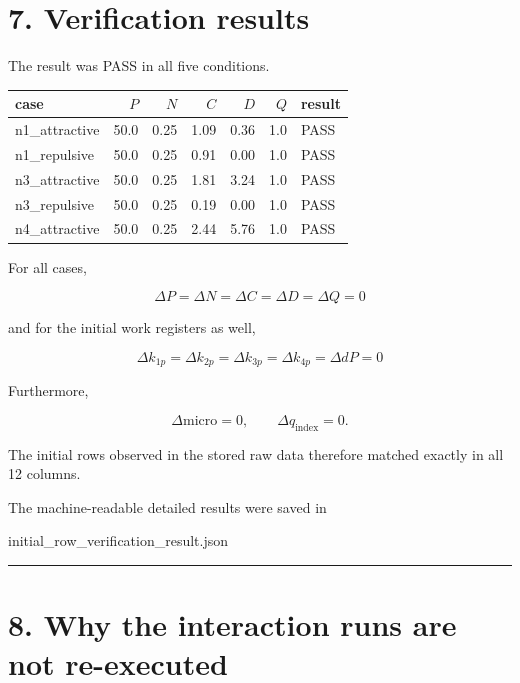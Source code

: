 \documentclass[
  a4paper,
]{article}
\newenvironment{Shaded}{}{}
\newcommand{\NormalTok}[1]{#1}
\newcounter{none} %
\begin{document}
\section{7. Verification results}\label{verification-results}

The result was PASS in all five conditions.

{\def\LTcaptype{none} %
\begin{longtable}[]{@{}lrrrrrl@{}}
\toprule\noalign{}
case & \(P\) & \(N\) & \(C\) & \(D\) & \(Q\) & result \\
\midrule\noalign{}
\endhead
\bottomrule\noalign{}
\endlastfoot
n1\_attractive & 50.0 & 0.25 & 1.09 & 0.36 & 1.0 & PASS \\
n1\_repulsive & 50.0 & 0.25 & 0.91 & 0.00 & 1.0 & PASS \\
n3\_attractive & 50.0 & 0.25 & 1.81 & 3.24 & 1.0 & PASS \\
n3\_repulsive & 50.0 & 0.25 & 0.19 & 0.00 & 1.0 & PASS \\
n4\_attractive & 50.0 & 0.25 & 2.44 & 5.76 & 1.0 & PASS \\
\end{longtable}
}

For all cases,

\[
\boxed{
\Delta P=
\Delta N=
\Delta C=
\Delta D=
\Delta Q=0
}
\]

and for the initial work registers as well,

\[
\boxed{
\Delta k_{1p}=
\Delta k_{2p}=
\Delta k_{3p}=
\Delta k_{4p}=
\Delta dP=0
}
\]

Furthermore,

\[
\Delta \mathrm{micro}=0,
\qquad
\Delta q_{\mathrm{index}}=0.
\]

The initial rows observed in the stored raw data therefore matched
exactly in all 12 columns.

The machine-readable detailed results were saved in

\begin{Shaded}
\begin{Highlighting}[]
\NormalTok{initial\_row\_verification\_result.json}
\end{Highlighting}
\end{Shaded}

\begin{center}\rule{0.5\linewidth}{0.5pt}\end{center}

\section{8. Why the interaction runs are not
re-executed}\label{why-the-interaction-runs-are-not-re-executed}
\end{document}
